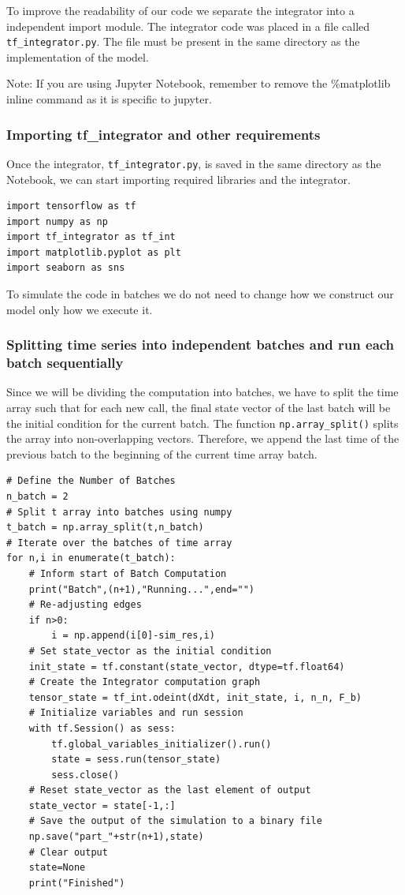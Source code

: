 \documentclass[10pt,letterpaper]{article}
\begin{document}
\begin{nolinenumbers}
To improve the readability of our code we separate the integrator into a independent import module. The integrator code was placed in a file called \texttt{tf\_integrator.py}. The file must be present in the same directory as the implementation of the model. 

Note: If you are using Jupyter Notebook, remember to remove the \%matplotlib inline command as it is specific to jupyter.

\subsubsection*{Importing tf\_integrator and other requirements}

Once the integrator, \texttt{tf\_integrator.py}, is saved in the same directory as the Notebook, we can start importing required libraries and the integrator.

\begin{verbatim}
import tensorflow as tf
import numpy as np
import tf_integrator as tf_int
import matplotlib.pyplot as plt
import seaborn as sns
\end{verbatim}

To simulate the code in batches we do not need to change how we construct our model only how we execute it.

\subsubsection*{Splitting time series into independent batches and run each batch sequentially}

Since we will be dividing the computation into batches, we have to split the time array such that for each new call, the final state vector of the last batch will be the initial condition for the current batch. The function \texttt{np.array\_split()} splits the array into non-overlapping vectors. Therefore, we append the last time of the previous batch to the beginning of the current time array batch.

\begin{verbatim}
# Define the Number of Batches
n_batch = 2
# Split t array into batches using numpy
t_batch = np.array_split(t,n_batch)
# Iterate over the batches of time array
for n,i in enumerate(t_batch):
    # Inform start of Batch Computation
    print("Batch",(n+1),"Running...",end="")
    # Re-adjusting edges
    if n>0:
        i = np.append(i[0]-sim_res,i)
    # Set state_vector as the initial condition
    init_state = tf.constant(state_vector, dtype=tf.float64)
    # Create the Integrator computation graph
    tensor_state = tf_int.odeint(dXdt, init_state, i, n_n, F_b)
    # Initialize variables and run session
    with tf.Session() as sess:
        tf.global_variables_initializer().run()
        state = sess.run(tensor_state)
        sess.close()
    # Reset state_vector as the last element of output
    state_vector = state[-1,:]
    # Save the output of the simulation to a binary file
    np.save("part_"+str(n+1),state)
    # Clear output
    state=None
    print("Finished")
\end{verbatim}


\end{nolinenumbers}
\end{document}
